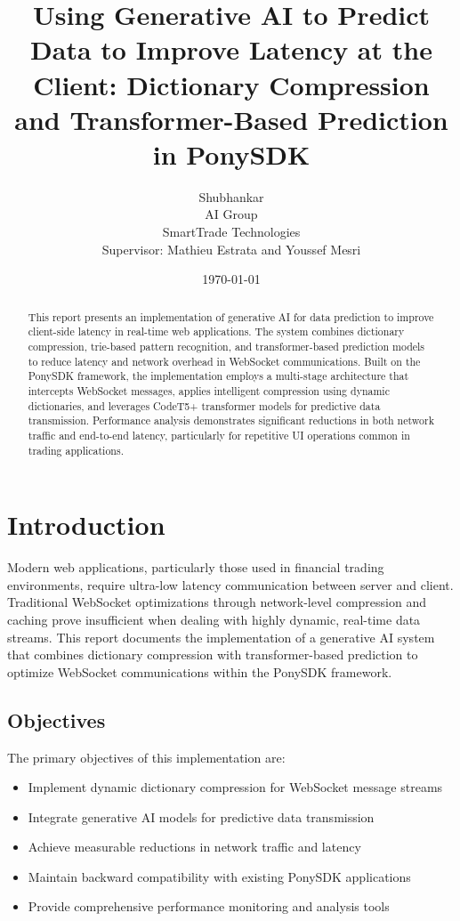 \documentclass[12pt,a4paper]{article}
\title{Using Generative AI to Predict Data to Improve Latency at the Client: Dictionary Compression and Transformer-Based Prediction in PonySDK}
\author{Shubhankar\\AI Group\\SmartTrade Technologies\\Supervisor: Mathieu Estrata and Youssef Mesri}
\date{\today}
\begin{document}
\maketitle

\begin{abstract}
This report presents an implementation of generative AI for data prediction to improve client-side latency in real-time web applications. The system combines dictionary compression, trie-based pattern recognition, and transformer-based prediction models to reduce latency and network overhead in WebSocket communications. Built on the PonySDK framework, the implementation employs a multi-stage architecture that intercepts WebSocket messages, applies intelligent compression using dynamic dictionaries, and leverages CodeT5+ transformer models for predictive data transmission. Performance analysis demonstrates significant reductions in both network traffic and end-to-end latency, particularly for repetitive UI operations common in trading applications.
\end{abstract}

\tableofcontents
\newpage

\section{Introduction}

Modern web applications, particularly those used in financial trading environments, require ultra-low latency communication between server and client. Traditional WebSocket optimizations through network-level compression and caching prove insufficient when dealing with highly dynamic, real-time data streams. This report documents the implementation of a generative AI system that combines dictionary compression with transformer-based prediction to optimize WebSocket communications within the PonySDK framework.

\subsection{Objectives}

The primary objectives of this implementation are:
\begin{itemize}
    \item Implement dynamic dictionary compression for WebSocket message streams
    \item Integrate generative AI models for predictive data transmission
    \item Achieve measurable reductions in network traffic and latency
    \item Maintain backward compatibility with existing PonySDK applications
    \item Provide comprehensive performance monitoring and analysis tools
\end{itemize}
\end{document}
